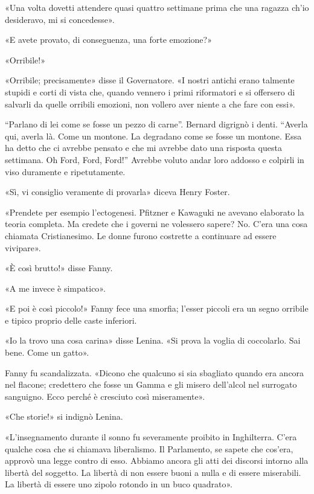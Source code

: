 \documentclass[
a5paper, %
10pt, %
twoside, 
onecolumn, %
openany, %
]{memoir}
\renewenvironment{shaded}{%
  \def\FrameCommand{\fboxsep=\FrameSep \colorbox{shadecolor}}%
  \MakeFramed{\advance\hsize-\width \FrameRestore\FrameRestore}}%
 {\endMakeFramed}
\begin{document}
«Una volta dovetti attendere quasi quattro settimane prima che una ragazza ch’io desideravo, mi si concedesse».

«E avete provato, di conseguenza, una forte emozione?»

«Orribile!»

«Orribile; precisamente» disse il Governatore. «I nostri antichi erano talmente stupidi e corti di vista che, quando vennero i primi riformatori e si offersero di salvarli da quelle orribili emozioni, non vollero aver niente a che fare con essi».

\begin{shaded}
    “Parlano di lei come se fosse un pezzo di carne”. Bernard digrignò i denti. “Averla qui, averla là. Come un montone. La degradano come se fosse un montone. Essa ha detto che ci avrebbe pensato e che mi avrebbe dato una risposta questa settimana. Oh Ford, Ford, Ford!” Avrebbe voluto andar loro addosso e colpirli in viso duramente e ripetutamente.

«Sì, vi consiglio veramente di provarla» diceva Henry Foster.
\end{shaded}

«Prendete per esempio l’ectogenesi. Pfitzner e Kawaguki ne avevano elaborato la teoria completa. Ma credete che i governi ne volessero sapere? No. C’era una cosa chiamata Cristianesimo. Le donne furono costrette a continuare ad essere vivipare».

\begin{shaded}
    «È così brutto!» disse Fanny.

«A me invece è simpatico».

«E poi è così piccolo!» Fanny fece una smorfia; l’esser piccoli era un segno orribile e tipico proprio delle caste inferiori.

«Io la trovo una cosa carina» disse Lenina. «Si prova la voglia di coccolarlo. Sai bene. Come un gatto».

Fanny fu scandalizzata. «Dicono che qualcuno si sia sbagliato quando era ancora nel flacone; credettero che fosse un Gamma e gli misero dell’alcol nel surrogato sanguigno. Ecco perché è cresciuto così miseramente».

«Che storie!» si indignò Lenina.
\end{shaded}

«L’insegnamento durante il sonno fu severamente proibito in Inghilterra. C’era qualche cosa che si chiamava liberalismo. Il Parlamento, se sapete che cos’era, approvò una legge contro di esso. Abbiamo ancora gli atti dei discorsi intorno alla libertà del soggetto. La libertà di non essere buoni a nulla e di essere miserabili. La libertà di essere uno zipolo rotondo in un buco quadrato».
\end{document}
